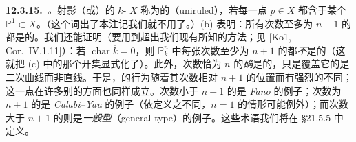 \textbf{12.3.15.}\ \emph{\trhRemark{}。}\quad 射影（或\trProper）的 $k$-\trVariety{} $X$ 称为\textbf{\trUniruled}的（uniruled），若每一点 $p\in X$ 都含于某个 $\mathbb{P}^1\subset X$。（这个词出了本注记我们就不用了。）(b) 表明：所有次数至多为 $n-1$ 的\trHypersurface{}都是\trUniruled{}的。我们还能证明（要用到超出我们现有所知的方法；见 [Ko1, Cor.~IV.1.11]）：若 $\operatorname{char}\overline{k}=0$，则 $\mathbb{P}^n_k$ 中每张次数至少为 $n+1$ 的\trSmooth\trHypersurface{}都\emph{不}是\trUniruled{}的（这就把 (c) 中的那个开集显式化了）。此外，次数恰为 $n$ 的\trSmooth\trHypersurface{}\emph{确}是\trUniruled{}的，只是覆盖它的是二次曲线而非直线。于是，\trHypersurface{}的行为随着其次数相对 $n+1$ 的位置而有强烈的不同；这一点在许多别的方面也同样成立。次数小于 $n+1$ 的\trSmooth\trHypersurface{}是 \emph{Fano} \trVariety{}的例子；次数为 $n+1$ 的\trSmooth\trHypersurface{}是 \emph{Calabi--Yau} \trVariety{}的例子（依定义之不同，$n=1$ 的情形可能例外）；而次数大于 $n+1$ 的\trSmooth\trHypersurface{}则是\emph{一般型}（general type）\trVariety{}的例子。这些术语我们将在 \S21.5.5 中定义。
